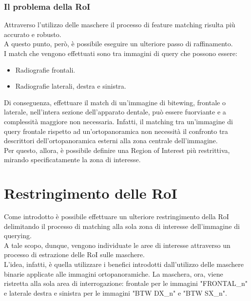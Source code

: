 \documentclass[12pt,a4paper,openright,twoside]{book}
\begin{document}
\subsection{Il problema della RoI}
Attraverso l'utilizzo delle maschere il processo di feature matching risulta più accurato e robusto.\\
A questo punto, però, è possibile eseguire un ulteriore passo di raffinamento. \\
I match che vengono effettuati sono tra immagini di query che possono essere:
\begin{itemize}
\item Radiografie frontali.
\item Radiografie laterali, destra e sinistra.
\end{itemize}

Di conseguenza, effettuare il match di un'immagine di bitewing, frontale o laterale, nell'intera sezione dell'apparato dentale, può essere fuorviante e a complessità maggiore non necessaria. Infatti, il matching tra un'immagine di query frontale rispetto ad un'ortopanoramica non necessità il confronto tra descrittori dell'ortopanoramica esterni alla zona centrale dell'immagine.\\
Per questo, allora, è possibile definire una Region of Interest più restrittiva, mirando specificatamente la zona di interesse. 


\chapter{Restringimento delle RoI}
Come introdotto è possibile effettuare un ulteriore restringimento della RoI delimitando il processo di matching alla sola zona di interesse dell'immagine di querying.\\
A tale scopo, dunque, vengono individuate le aree di interesse attraverso un processo di estrazione delle RoI sulle maschere.\\
L'idea, infatti, è quella utilizzare i benefici introdotti dall'utilizzo delle maschere binarie applicate alle immagini ortopanoramiche. La maschera, ora, viene ristretta alla sola area di interrogazione: frontale per le immagini "FRONTAL\_n" e laterale destra e sinistra per le immagini "BTW DX\_n" e "BTW SX\_n".\\
\end{document}
